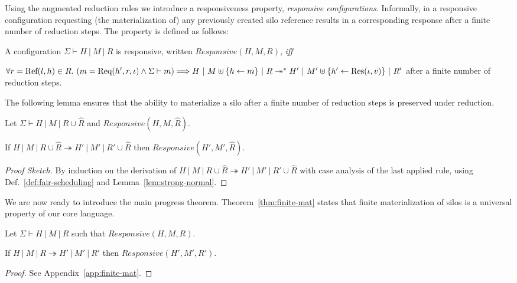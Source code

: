 Using the augmented reduction rules we introduce a responsiveness
property, {\em responsive configurations}. Informally, in a responsive
configuration requesting (the materialization of) any previously
created silo reference results in a corresponding response after a
finite number of reduction steps. The property is defined as follows:

\begin{defn}\label{def:resp-config}
  A configuration $\Sigma \vdash H~|~M~|~R$ is responsive, written
  $\mathit{Responsive}(H, M, R)$, {\em iff}

  $\forall r = {\textrm{Ref}(l, h)} \in R.~(m = {\textrm{Req}(h', r, \iota)} \land \Sigma \vdash m) \Longrightarrow H ~|~ M \uplus \{h \leftarrow m\} ~|~ R \twoheadrightarrow^* H' ~|~ M' \uplus \{h' \leftarrow {\textrm{Res}(\iota, v)}\} ~|~ R'$ after a finite number of reduction steps.
\end{defn}

The following lemma ensures that the ability to materialize a silo
after a finite number of reduction steps is preserved under reduction.

\begin{lem}[Responsiveness]\label{lem:resp}
  Let $\Sigma \vdash H~|~M~|~R \cup \hat{R}$ and
  $\mathit{Responsive}(H, M, \hat{R})$.

  If $H~|~M~|~R \cup \hat{R} \twoheadrightarrow H'~|~M'~|~R' \cup
  \hat{R}$ then $\mathit{Responsive}(H', M', \hat{R})$.
\end{lem}
\begin{proof}[Proof Sketch]
  By induction on the derivation of $H~|~M~|~R \cup \hat{R}
  \twoheadrightarrow H'~|~M'~|~R' \cup \hat{R}$ with case analysis of
  the last applied rule, using Def.~\ref{def:fair-scheduling} and
  Lemma~\ref{lem:strong-normal}.
\end{proof}

We are now ready to introduce the main progress
theorem. Theorem~\ref{thm:finite-mat} states that finite
materialization of silos is a universal property of our core language.

\begin{thm}\label{thm:finite-mat}
  Let $\Sigma \vdash H~|~M~|~R$ such that $\mathit{Responsive}(H, M,
  R)$.

  If $H~|~M~|~R \twoheadrightarrow H'~|~M'~|~R'$ then
  $\mathit{Responsive}(H', M', R')$.
\end{thm}
\begin{proof}
  See Appendix~\ref{app:finite-mat}.
\end{proof}
